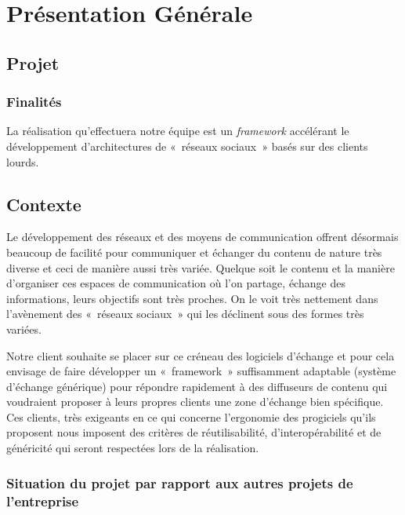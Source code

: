 \section{Présentation Générale}
\subsection{Projet}
\subsubsection{Finalités}

La réalisation qu'effectuera notre équipe est un \textit{framework} accélérant le développement d'architectures de «~réseaux sociaux~» basés sur des clients lourds.


\subsection{Contexte}

Le développement des réseaux et des moyens de communication offrent désormais beaucoup de facilité pour communiquer et échanger du contenu de nature très diverse et ceci de manière aussi très variée. Quelque soit le contenu et la manière d’organiser ces espaces de communication où l’on partage, échange des informations, leurs objectifs sont très proches.
On le voit très nettement dans l’avènement des «~réseaux sociaux~» qui les déclinent sous des formes très variées.

Notre client souhaite se placer sur ce créneau des logiciels d’échange et pour cela envisage de faire développer un «~framework~» suffisamment adaptable (système d’échange générique) pour répondre rapidement à des diffuseurs de contenu qui voudraient proposer à leurs propres clients une zone d’échange bien spécifique. Ces clients, très exigeants en ce qui concerne l’ergonomie des progiciels qu’ils proposent nous imposent des critères de réutilisabilité, d'interopérabilité et de généricité qui seront respectées lors de la réalisation.

\subsubsection{Situation du projet par rapport aux autres projets de l’entreprise}

